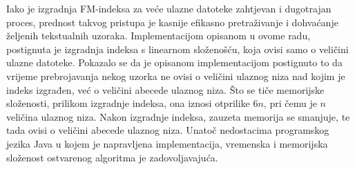 Iako je izgradnja FM-indeksa za veće ulazne datoteke zahtjevan i dugotrajan proces, prednost takvog pristupa je kasnije efikasno pretraživanje i dohvaćanje željenih tekstualnih uzoraka. Implementacijom opisanom u ovome radu, postignuta je izgradnja indeksa s linearnom složenošću, koja ovisi samo o veličini ulazne datoteke. Pokazalo se da je opisanom implementacijom postignuto to da vrijeme prebrojavanja nekog uzorka ne ovisi o veličini ulaznog niza nad kojim je indeks izgrađen, već o veličini abecede ulaznog niza. Što se tiče memorijske složenosti, prilikom izgradnje indeksa, ona iznosi otprilike $6n$, pri čemu je $n$ veličina ulaznog niza. Nakon izgradnje indeksa, zauzeta memorija se smanjuje, te tada ovisi o veličini abecede ulaznog niza. Unatoč nedostacima programskog jezika Java u kojem je napravljena implementacija, vremenska i memorijska složenost ostvarenog algoritma je zadovoljavajuća.